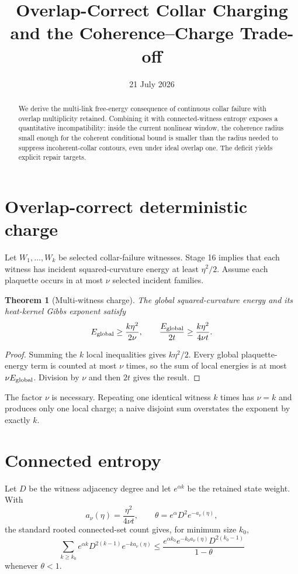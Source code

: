 \documentclass[11pt]{article}
\title{Overlap-Correct Collar Charging and the Coherence--Charge Trade-off}
\author{}
\date{21 July 2026}
\newtheorem{theorem}{Theorem}
\begin{document}
\maketitle

\begin{abstract}
We derive the multi-link free-energy consequence of continuous collar failure
with overlap multiplicity retained.  Combining it with connected-witness
entropy exposes a quantitative incompatibility: inside the current nonlinear
window, the coherence radius small enough for the coherent conditional bound
is smaller than the radius needed to suppress incoherent-collar contours, even
under ideal overlap one.  The deficit yields explicit repair targets.
\end{abstract}

\section{Overlap-correct deterministic charge}

Let $W_1,\dots,W_k$ be selected collar-failure witnesses.  Stage 16 implies
that each witness has incident squared-curvature energy at least $\eta^2/2$.
Assume each plaquette occurs in at most $\nu$ selected incident families.

\begin{theorem}[Multi-witness charge]
The global squared-curvature energy and its heat-kernel Gibbs exponent satisfy
\[
 E_{\rm global}\ge \frac{k\eta^2}{2\nu},
 \qquad
 \frac{E_{\rm global}}{2t}\ge\frac{k\eta^2}{4\nu t}.
\]
\end{theorem}

\begin{proof}
Summing the $k$ local inequalities gives $k\eta^2/2$.  Every global
plaquette-energy term is counted at most $\nu$ times, so the sum of local
energies is at most $\nu E_{\rm global}$.  Division by $\nu$ and then $2t$
gives the result.
\end{proof}

The factor $\nu$ is necessary.  Repeating one identical witness $k$ times has
$\nu=k$ and produces only one local charge; a naive disjoint sum overstates
the exponent by exactly $k$.

\section{Connected entropy}

Let $D$ be the witness adjacency degree and let $e^{\alpha k}$ be the retained
state weight.  With
\[
 a_\nu(\eta)=\frac{\eta^2}{4\nu t},\qquad
 \theta=e^\alpha D^2e^{-a_\nu(\eta)},
\]
the standard rooted connected-set count gives, for minimum size $k_0$,
\[
 \sum_{k\ge k_0}e^{\alpha k}D^{2(k-1)}e^{-ka_\nu(\eta)}
 \le
 \frac{e^{\alpha k_0}e^{-k_0a_\nu(\eta)}D^{2(k_0-1)}}{1-\theta}
\]
whenever $\theta<1$.
\end{document}
